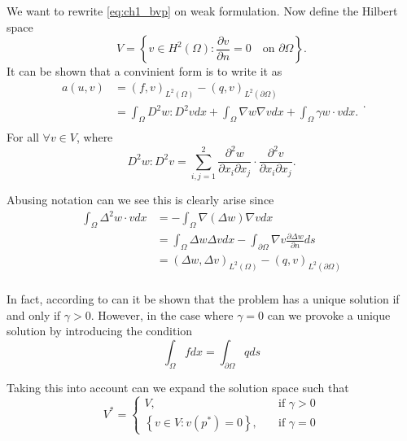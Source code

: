 We want to rewrite \eqref{eq:ch1_bvp} on weak formulation. Now define the Hilbert space \[
V = \left\{ v \in H^2\left( \Omega  \right): \frac{\partial v}{\partial  n}  = 0 \quad \text{on } \partial \Omega
\right\}.
\]
It can be shown \cite{gu2012c0} that a convinient form is to write it as
\begin{equation}
\label{eq:weakform}
    \begin{split}
a\left( u,v \right) &=  \left( f,v \right)_{L^2\left( \Omega  \right)}  - \left( q,v \right)_{L^2\left( \partial \Omega  \right)}  \\
& = \int_{\Omega }^{} D^2 w : D^2 v dx +  \int_{\Omega }^{} \nabla w \nabla v dx + \int_{\Omega }^{} \gamma w \cdot v dx
.\\
    \end{split}
.\end{equation}
For all $\forall v \in  V$, where \[
D^2 w : D^2 v = \sum_{i,j=1}^{2}  \frac{\partial ^2 w}{\partial x_{i} \partial x_{j} } \cdot  \frac{\partial ^2 v
}{\partial x_{i} \partial x_{j} }.
\]

Abusing notation can we see this is clearly arise since \[
    \begin{split}
\int_{\Omega }^{} \Delta ^2 w \cdot  v   dx & = - \int_{\Omega }^{} \nabla \left( \Delta w \right) \nabla v dx \\
&= \int_{\Omega }^{} \Delta w \Delta v dx  -\int_{\partial \Omega }^{} \nabla v \frac{\partial \Delta w}{\partial n } ds   \\
&= \left( \Delta w, \Delta v \right)_{L^2\left( \Omega  \right)} - \left( q,v \right) _{L^2\left( \partial \Omega  \right)} \\
    \end{split}
\]

In fact, according to \cite{gu2012c0} can it be shown that the problem has a unique solution if and only if $\gamma >
0$. However, in the case where $\gamma  = 0$ can we provoke a unique solution by introducing the condition \[
\int_{\Omega }^{} f dx = \int_{\partial \Omega }^{}  q ds
\]

Taking this into account can we expand the solution space such that \[
V^* = \begin{cases}
    V, \quad & \text{if } \gamma >0 \\
    \left\{ v \in V: v\left( p^* \right) = 0 \right\}, \quad & \text{if } \gamma  =0
\end{cases}
\]

